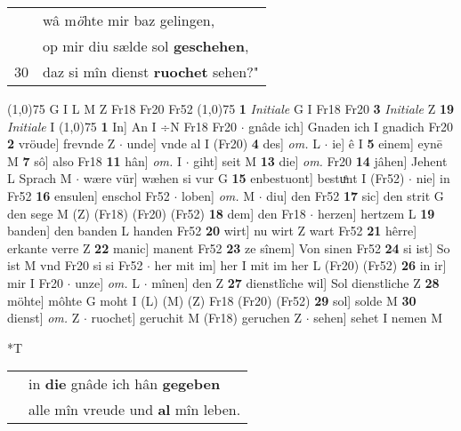 \documentclass[8pt,a4paper,notitlepage]{article}
\begin{document}
\begin{table}[ht]
\begin{minipage}[t]{0.5\linewidth}
\begin{tabular}{rl}
 & wâ m\textit{ö}hte mir baz gelingen,\\ 
 & op mir diu sælde sol \textbf{geschehen},\\ 
30 & daz si mîn dienst \textbf{ruochet} sehen?"\\ 
\end{tabular}
\scriptsize
\line(1,0){75} \newline
G I L M Z Fr18 Fr20 Fr52 \newline
\line(1,0){75} \newline
\textbf{1} \textit{Initiale} G I Fr18 Fr20  \textbf{3} \textit{Initiale} Z  \textbf{19} \textit{Initiale} I  \newline
\line(1,0){75} \newline
\textbf{1} In] An I ÷N Fr18 Fr20  $\cdot$ gnâde ich] Gnaden ich I gnadich Fr20 \textbf{2} vröude] frevnde Z  $\cdot$ unde] vnde al I (Fr20) \textbf{4} des] \textit{om.} L  $\cdot$ ie] ê I \textbf{5} einem] eynē M \textbf{7} sô] also Fr18 \textbf{11} hân] \textit{om.} I  $\cdot$ giht] seit M \textbf{13} die] \textit{om.} Fr20 \textbf{14} jâhen] Jehent L Sprach M  $\cdot$ wære vür] wæhen si vur G \textbf{15} enbestuont] bestuͤnt I (Fr52)  $\cdot$ nie] in Fr52 \textbf{16} ensulen] enschol Fr52  $\cdot$ loben] \textit{om.} M  $\cdot$ diu] den Fr52 \textbf{17} sic] den strit G den sege M (Z) (Fr18) (Fr20) (Fr52) \textbf{18} dem] den Fr18  $\cdot$ herzen] hertzem L \textbf{19} banden] den banden L handen Fr52 \textbf{20} wirt] nu wirt Z wart Fr52 \textbf{21} hêrre] erkante verre Z \textbf{22} manic] manent Fr52 \textbf{23} ze sînem] Von sinen Fr52 \textbf{24} si ist] So ist M vnd Fr20 si si Fr52  $\cdot$ her mit im] her I mit im her L (Fr20) (Fr52) \textbf{26} in ir] mir I Fr20  $\cdot$ unze] \textit{om.} L  $\cdot$ mînen] den Z \textbf{27} dienstlîche wil] Sol dienstliche Z \textbf{28} möhte] môhte G moht I (L) (M) (Z) Fr18 (Fr20) (Fr52) \textbf{29} sol] solde M \textbf{30} dienst] \textit{om.} Z  $\cdot$ ruochet] geruchit M (Fr18) geruchen Z  $\cdot$ sehen] sehet I nemen M \newline
\end{minipage}
\hspace{0.5cm}
\begin{minipage}[t]{0.5\linewidth}
\small
\begin{center}*T
\end{center}
\begin{tabular}{rl}
 & in \textbf{die} gnâde ich hân \textbf{gegeben}\\ 
 & alle mîn vreude und \textbf{al} mîn leben.\\ 

\end{tabular}
\end{minipage}
\end{table}
\end{document}

